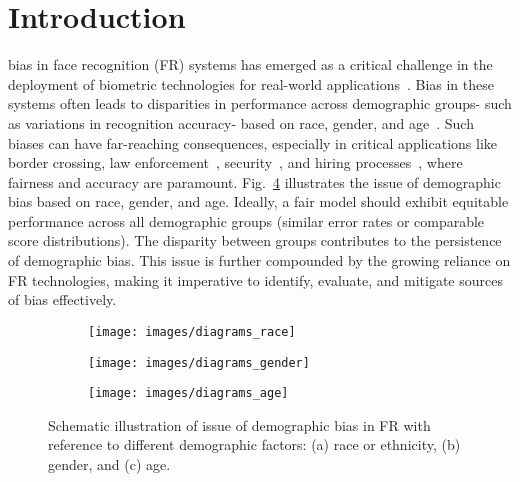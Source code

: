 \section{Introduction}
\label{sec:intro}

 bias in face recognition (FR) systems has emerged as a critical
challenge in the deployment of biometric technologies for real-world
applications~\cite{rathgeb2022demographic, sixta2020fairface,
drozdowski2020demographic, jain2021biometrics}. Bias in these systems often
leads to disparities in performance across demographic groups- such as
variations in recognition accuracy- based on race, gender, and
age~\cite{jain2021biometrics, mehrabi2021survey, howard2019effect}. Such biases
can have far-reaching consequences, especially in critical applications like
border crossing, law enforcement~\cite{limante2024, jones2020law},
security~\cite{leslie2020understanding}, and hiring
processes~\cite{burgess2022watching, raji2020saving, pena2020bias}, where
fairness and accuracy are paramount. Fig.~\ref{fig:intro} illustrates the issue
of demographic bias based on race, gender, and age. Ideally, a fair model should
exhibit equitable performance across all demographic groups (\ie similar error
rates or comparable score distributions). The disparity between groups
contributes to the persistence of demographic bias. This issue is further
compounded by the growing reliance on FR technologies, making it imperative to
identify, evaluate, and mitigate sources of bias effectively.

\begin{figure}[!t]
\centering
\begin{subfigure}{0.9\columnwidth}
\texttt{[image: images/diagrams\_race]}
\caption{}
\label{fig:race1}
\end{subfigure}
%
%
\begin{subfigure}{0.8\columnwidth}
\texttt{[image: images/diagrams\_gender]}
\caption{}
\label{fig:gender1}
\end{subfigure}
%
%
\begin{subfigure}{0.8\columnwidth}
\texttt{[image: images/diagrams\_age]}
\caption{}
\label{fig:age1}
\end{subfigure}
%
\caption{Schematic illustration of issue of demographic bias in FR with reference to 
different demographic factors: (a) race or ethnicity, (b) gender, and (c) age.}
\label{fig:intro}
\end{figure}

